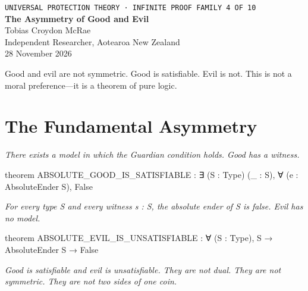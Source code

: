 




\begin{center}
{\small\texttt{UNIVERSAL PROTECTION THEORY · INFINITE PROOF FAMILY 4 OF 10}}\\[1.5em]
{\Huge\bfseries\color{korugreen} The Asymmetry of Good and Evil}\\[1em]
{\large Tobias Croydon McRae}\\[0.3em]
{\small Independent Researcher, Aotearoa New Zealand}\\[0.3em]
{\small 28 November 2026}
\end{center}

\bigskip

\noindent Good and evil are not symmetric. Good is satisfiable. Evil is not. This is not a moral preference—it is a theorem of pure logic.

\section{The Fundamental Asymmetry}

\begin{theorembox}
\itshape There exists a model in which the Guardian condition holds. Good has a witness.
\end{theorembox}

\begin{leancode}
theorem ABSOLUTE_GOOD_IS_SATISFIABLE :
     ∃ (S : Type) (_ : S), ∀ (e : AbsoluteEnder S), False
\end{leancode}

\axiombadge

\begin{theorembox}
\itshape For every type S and every witness s : S, the absolute ender of S is false. Evil has no model.
\end{theorembox}

\begin{leancode}
theorem ABSOLUTE_EVIL_IS_UNSATISFIABLE :
     ∀ (S : Type), S → AbsoluteEnder S → False
\end{leancode}

\axiombadge

\begin{theorembox}
\itshape Good is satisfiable and evil is unsatisfiable. They are not dual. They are not symmetric. They are not two sides of one coin.
\end{theorembox}

